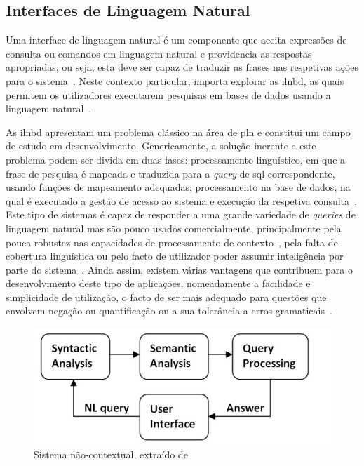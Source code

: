 \subsection{Interfaces de Linguagem Natural}
Uma interface de linguagem natural é um componente que aceita expressões de consulta ou comandos em linguagem natural e providencia as respostas apropriadas, ou seja, esta deve ser capaz de traduzir as frases nas respetivas ações para o sistema~\parencite{nlp}. Neste contexto particular, importa explorar as \gls{ilnbd}, as quais permitem os utilizadores executarem pesquisas em bases de dados usando a linguagem natural~\parencite{overview_nlidb_approaches_implementation_airline, novel_approach_building_generic_portable_contextual_nlidb_system}.

As \gls{ilnbd} apresentam um problema clássico na área de \gls{pln} e constitui um campo de estudo em desenvolvimento. Genericamente, a solução inerente a este problema podem ser divida em duas fases: processamento linguístico, em que a frase de pesquisa é mapeada e traduzida para a \textit{query} de \gls{sql} correspondente, usando funções de mapeamento adequadas; processamento na base de dados, na qual é executado a gestão de acesso ao sistema e execução da respetiva consulta~\parencite{overview_nlidb_approaches_implementation_airline}. Este tipo de sistemas é capaz de responder a uma grande variedade de \textit{queries} de linguagem natural mas são pouco usados comercialmente, principalmente pela pouca robustez nas capacidades de processamento de contexto~\parencite{novel_approach_towards_incorporating_context_processing_nlidb}, pela falta de cobertura linguística ou pelo facto de utilizador poder assumir inteligência por parte do sistema~\parencite{survey_nlidb, overview_nlidb_approaches_implementation_airline}. Ainda assim, existem várias vantagens que contribuem para o desenvolvimento deste tipo de aplicações, nomeadamente a facilidade e simplicidade de utilização, o facto de ser mais adequado para questões que envolvem negação ou quantificação ou a sua tolerância a erros gramaticais~\parencite{survey_nlidb, nlidb_brief_review, overview_nlidb_approaches_implementation_airline}.

\begin{figure}[!h]
    \centering
    \includegraphics[width=.6\textwidth]{ch03/assets/non_contextual_nlidb.jpg}
    \caption{Sistema  não-contextual, extraído de~\textcite{novel_approach_towards_incorporating_context_processing_nlidb}}
    \label{fig:noncontextual_nlidb}
\end{figure}

